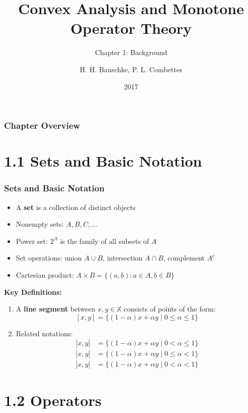 \documentclass[aspectratio=169,10pt]{beamer}
\title[Chapter 1: Background]{Convex Analysis and Monotone Operator Theory}
\subtitle{Chapter 1: Background}
\author{H. H. Bauschke, P. L. Combettes}
\date{2017}
\begin{document}
\frame{\titlepage}

\begin{frame}
\frametitle{Chapter Overview}
\tableofcontents
\end{frame}

\section{1.1 Sets and Basic Notation}

\begin{frame}[allowframebreaks]
\frametitle{Sets and Basic Notation}

\begin{itemize}
\item A \textbf{set} is a collection of distinct objects
\item Nonempty sets: $A, B, C, \ldots$
\item Power set: $2^A$ is the family of all subsets of $A$
\item Set operations: union $A \cup B$, intersection $A \cap B$, complement $A^c$
\item Cartesian product: $A \times B = \{(a,b) : a \in A, b \in B\}$
\end{itemize}

\vspace{0.5cm}

\textbf{Key Definitions:}
\begin{enumerate}
\item A \textbf{line segment} between $x, y \in \mathbb{X}$ consists of points of the form:
$$[x, y] = \{(1-\alpha)x + \alpha y \mid 0 \leq \alpha \leq 1\}$$

\item Related notations:
\begin{align*}
]x, y] &= \{(1-\alpha)x + \alpha y \mid 0 < \alpha \leq 1\} \\
[x, y[ &= \{(1-\alpha)x + \alpha y \mid 0 \leq \alpha < 1\} \\
]x, y[ &= \{(1-\alpha)x + \alpha y \mid 0 < \alpha < 1\}
\end{align*}
\end{enumerate}

\end{frame}

\section{1.2 Operators}
\end{document}
